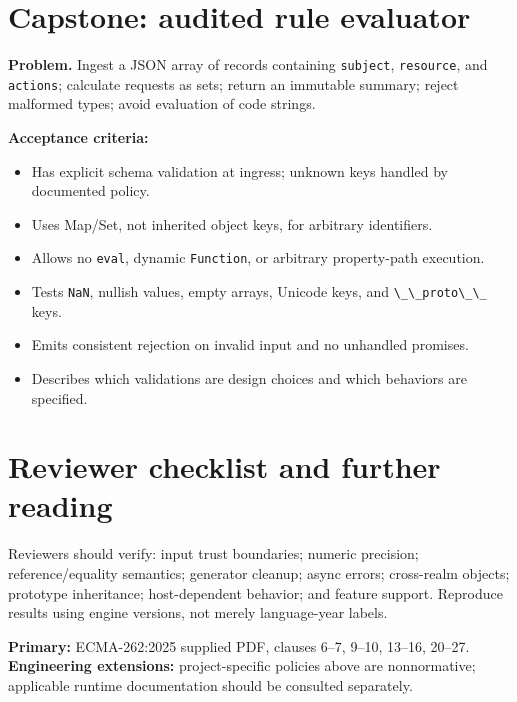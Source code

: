 \documentclass[11pt,letterpaper]{article}
\providecommand{\tightlist}{\setlength{\itemsep}{0pt}\setlength{\parskip}{0pt}}
\newcommand{\passthrough}[1]{#1}
\begin{document}
\section{Capstone: audited rule evaluator}\label{capstone-audited-rule-evaluator}

\textbf{Problem.} Ingest a JSON array of records containing \passthrough{\lstinline!subject!}, \passthrough{\lstinline!resource!}, and \passthrough{\lstinline!actions!}; calculate requests as sets; return an immutable summary; reject malformed types; avoid evaluation of code strings.

\textbf{Acceptance criteria:}

\begin{itemize}
\tightlist
\item[$\square$]
  Has explicit schema validation at ingress; unknown keys handled by documented policy.
\item[$\square$]
  Uses Map/Set, not inherited object keys, for arbitrary identifiers.
\item[$\square$]
  Allows no \passthrough{\lstinline!eval!}, dynamic \passthrough{\lstinline!Function!}, or arbitrary property-path execution.
\item[$\square$]
  Tests \passthrough{\lstinline!NaN!}, nullish values, empty arrays, Unicode keys, and \passthrough{\lstinline!\_\_proto\_\_!} keys.
\item[$\square$]
  Emits consistent rejection on invalid input and no unhandled promises.
\item[$\square$]
  Describes which validations are design choices and which behaviors are specified.
\end{itemize}

\section{Reviewer checklist and further reading}\label{reviewer-checklist-and-further-reading}

Reviewers should verify: input trust boundaries; numeric precision; reference/equality semantics; generator cleanup; async errors; cross-realm objects; prototype inheritance; host-dependent behavior; and feature support. Reproduce results using engine versions, not merely language-year labels.

\textbf{Primary:} ECMA-262:2025 supplied PDF, clauses 6--7, 9--10, 13--16, 20--27. \textbf{Engineering extensions:} project-specific policies above are nonnormative; applicable runtime documentation should be consulted separately.
\end{document}
